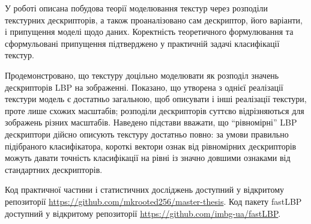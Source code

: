 У роботі описана побудова теорії моделювання текстур через розподіли текстурних дескрипторів,
а також проаналізовано сам дескриптор, його варіанти, і припущення моделі щодо даних.
Коректність теоретичного формулювання та сформульовані припущення підтверджено 
у практичній задачі класифікації текстур.

Продемонстровано, що текстуру доцільно моделювати як розподіл значень дескрипторів LBP на зображенні.
Показано, що утворена з однієї реалізації текстури модель є достатньо загальною, 
щоб описувати і інші реалізації текстури, проте лише схожих масштабів; 
розподіли дескрипторів суттєво відрізняються для зображень різних масштабів.
Наведено підстави вважати, що ``рівномірні'' LBP дескриптори дійсно описують текстуру достатньо повно: 
за умови правильно підібраного класифікатора, короткі вектори ознак від рівномірних дескрипторів можуть 
давати точність класифікації на рівні із значно довшими ознаками від стандартних дескрипторів. 

Код практичної частини і статистичних досліджень доступний у відкритому репозиторії \url{https://github.com/mkrooted256/master-thesis}.
Код пакету fastLBP доступний у відкритому репозиторії \url{https://github.com/imbg-ua/fastLBP}.
